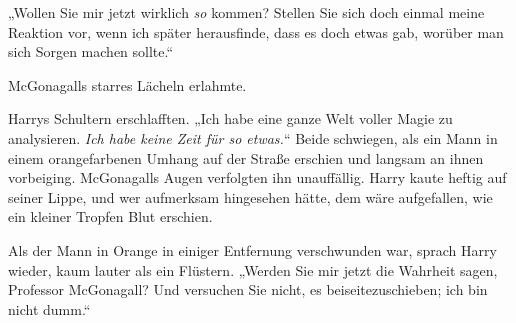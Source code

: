 „Wollen Sie mir jetzt wirklich \emph{so} kommen? Stellen Sie sich doch einmal meine Reaktion vor, wenn ich später herausfinde, dass es doch etwas gab, worüber man sich Sorgen machen sollte.“

McGonagalls starres Lächeln erlahmte.

Harrys Schultern erschlafften.
„Ich habe eine ganze Welt voller Magie zu analysieren. \emph{Ich habe keine Zeit für so etwas.}“
Beide schwiegen, als ein Mann in einem orangefarbenen Umhang auf der Straße erschien und langsam an ihnen vorbeiging. McGonagalls Augen verfolgten ihn unauffällig. Harry kaute heftig auf seiner Lippe, und wer aufmerksam hingesehen hätte, dem wäre aufgefallen, wie ein kleiner Tropfen Blut erschien.

Als der Mann in Orange in einiger Entfernung verschwunden war, sprach Harry wieder, kaum lauter als ein Flüstern.
„Werden Sie mir jetzt die Wahrheit sagen, Professor McGonagall? Und versuchen Sie nicht, es beiseitezuschieben; ich bin nicht dumm.“

